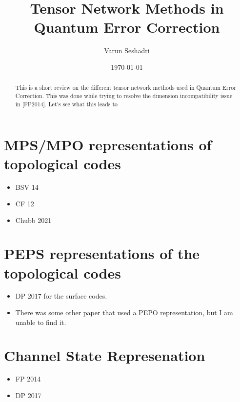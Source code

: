 \documentclass[%
 reprint,
amsmath,amssymb,
aps,
onecolumn,
]{revtex4-2}
\begin{document}

\title{Tensor Network Methods in Quantum Error Correction}%

\author{Varun Seshadri }

\date{\today}

\begin{abstract}
    This is a short review on the different tensor network methods used in Quantum Error Correction.
    This was done while trying to resolve the dimension incompatibility issue in [FP2014]. Let's see what this leads to

\end{abstract}

\maketitle

\section{MPS/MPO representations of topological codes}
\begin{itemize}
    \item BSV 14
    \item CF 12
    \item Chubb 2021
\end{itemize}


\section{PEPS representations of the topological codes}
\begin{itemize}
    \item DP 2017 for the surface codes.
    \item There was some other paper that used a PEPO representation, but I am unable to find it.
\end{itemize}

\section{Channel State Represenation}
\begin{itemize}
    \item FP 2014
    \item DP 2017
\end{itemize}
\end{document}
